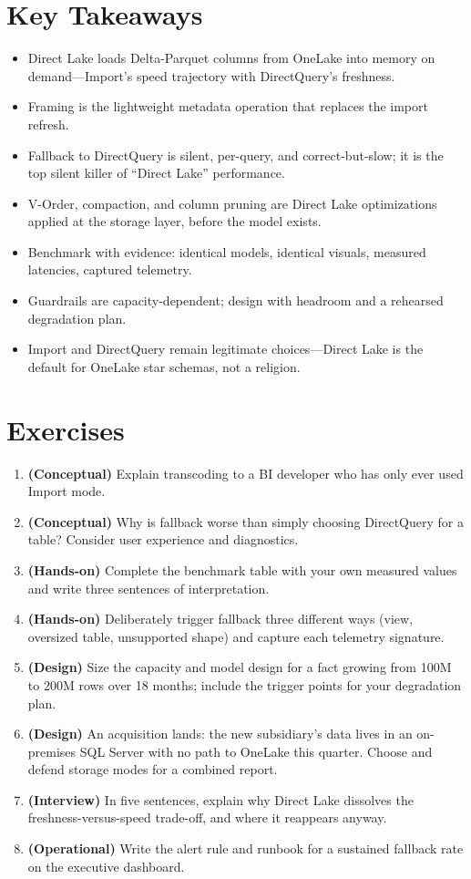 \section*{Key Takeaways}
\begin{itemize}
    \item Direct Lake loads Delta-Parquet columns from OneLake into memory on demand---Import's speed trajectory with DirectQuery's freshness.
    \item Framing is the lightweight metadata operation that replaces the import refresh.
    \item Fallback to DirectQuery is silent, per-query, and correct-but-slow; it is the top silent killer of ``Direct Lake'' performance.
    \item V-Order, compaction, and column pruning are Direct Lake optimizations applied at the storage layer, before the model exists.
    \item Benchmark with evidence: identical models, identical visuals, measured latencies, captured telemetry.
    \item Guardrails are capacity-dependent; design with headroom and a rehearsed degradation plan.
    \item Import and DirectQuery remain legitimate choices---Direct Lake is the default for OneLake star schemas, not a religion.
\end{itemize}

\section{Exercises}
\begin{enumerate}
    \item \textbf{(Conceptual)} Explain transcoding to a BI developer who has only ever used Import mode.
    \item \textbf{(Conceptual)} Why is fallback worse than simply choosing DirectQuery for a table? Consider user experience and diagnostics.
    \item \textbf{(Hands-on)} Complete the benchmark table with your own measured values and write three sentences of interpretation.
    \item \textbf{(Hands-on)} Deliberately trigger fallback three different ways (view, oversized table, unsupported shape) and capture each telemetry signature.
    \item \textbf{(Design)} Size the capacity and model design for a fact growing from 100M to 200M rows over 18 months; include the trigger points for your degradation plan.
    \item \textbf{(Design)} An acquisition lands: the new subsidiary's data lives in an on-premises SQL Server with no path to OneLake this quarter. Choose and defend storage modes for a combined report.
    \item \textbf{(Interview)} In five sentences, explain why Direct Lake dissolves the freshness-versus-speed trade-off, and where it reappears anyway.
    \item \textbf{(Operational)} Write the alert rule and runbook for a sustained fallback rate on the executive dashboard.
\end{enumerate}

